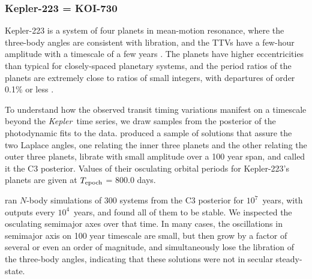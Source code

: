 \documentclass{aastex62}
\newcommand{\ik}{{\it Kepler~}}
\begin{document}
\subsubsection{Kepler-223 = KOI-730}

Kepler-223 is a system of four planets in mean-motion resonance, where the three-body angles are consistent with libration, and the TTVs have a few-hour amplitude with a timescale of a few years \citep{Mills:2016}.  The planets have higher eccentricities than typical for closely-spaced planetary systems, and the period ratios of the planets are extremely  close to ratios of small integers, with departures of order 0.1\% or less \citep{Lissauer:2011b,Mills:2016}. 

To understand how the observed transit timing variations manifest on a timescale beyond the \ik time series, we draw samples from the posterior of the photodynamic fits to the data.  \cite{Mills:2016} produced a sample of solutions that assure the two Laplace angles,  one relating the inner three planets and the other relating the outer three planets, librate with small amplitude over a 100 year span, and called it the C3 posterior.  Values of their osculating orbital periods for Kepler-223's planets are given at $T_{\rm epoch}$ = 800.0 days.  %

\cite{Mills:2016} ran $N$-body simulations of 300 systems from the C3 posterior for $10^7$~years, with outputs every $10^4$~years, and found all of them to be stable.  We inspected the osculating semimajor axes over that time.  In many cases, the oscillations in semimajor axis on 100 year timescale are small, but then grow by a factor of several or even an order of magnitude, and simultaneously lose the libration of the three-body angles, indicating that these solutions were not in secular steady-state.
\end{document}
